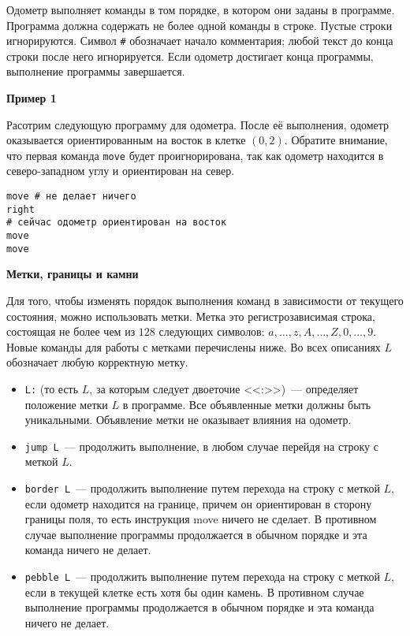 Одометр выполняет команды в том порядке, в котором они заданы в программе.
Программа должна содержать не более одной команды в строке. Пустые строки
игнорируются. Символ \texttt{#} обозначает начало комментария; любой текст до конца строки
после него игнорируется. Если одометр достигает конца программы, выполнение
программы завершается.

\textbf{Пример 1}

Расотрим следующую программу для одометра. После её выполнения, одометр
оказывается ориентированным на восток в клетке $(0, 2)$. Обратите внимание, что первая
команда \texttt{move} будет проигнорирована, так как одометр находится в северо-западном углу
и ориентирован на север.

\begin{lstlisting}
move # не делает ничего
right
# сейчас одометр ориентирован на восток
move
move
\end{lstlisting} 

\textbf{Метки, границы и камни}

Для того, чтобы изменять порядок выполнения команд в зависимости от текущего
состояния, можно использовать метки. Метка это регистрозависимая строка, состоящая не
более чем из $128$ следующих символов: $a, \ldots, z, A, \ldots, Z, 0, \ldots, 9$. Новые команды для
работы с метками перечислены ниже. Во всех описаниях $L$ обозначает любую корректную
метку.

\begin{itemize}
\item \texttt{L:} (то есть $L$, за которым следует двоеточие <<:>>)~--- определяет положение метки $L$ в
программе. Все объявленные метки должны быть уникальными. Объявление метки
не оказывает влияния на одометр.
\item \texttt{jump L}~--- продолжить выполнение, в любом случае перейдя на строку с меткой $L$.
\item \texttt{border L}~--- продолжить выполнение путем перехода на строку с меткой $L$, если
одометр находится на границе, причем он ориентирован в сторону границы поля, то есть
инструкция move ничего не сделает. В противном случае выполнение программы
продолжается в обычном порядке и эта команда ничего не делает.
\item \texttt{pebble L}~--- продолжить выполнение путем перехода на строку с меткой $L$, если в
текущей клетке есть хотя бы один камень. В противном случае выполнение
программы продолжается в обычном порядке и эта команда ничего не делает.

\end{itemize}

